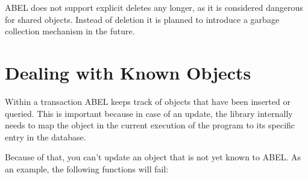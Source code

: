 \documentclass[a4paper,12pt]{report}
\begin{document}
ABEL does not support explicit deletes any longer, as it is considered dangerous for shared objects.
Instead of deletion it is planned to introduce a garbage collection mechanism in the future.

\section{Dealing with Known Objects}
\label{section:dealing_with_known_objects}

Within a transaction ABEL keeps track of objects that have been inserted or queried.
This is important because in case of an update, the library internally needs to map the object in the current execution of the program to its specific entry in the database.

Because of that, you can't update an object that is not yet known to ABEL.
As an example, the following functions will fail:
\end{document}

